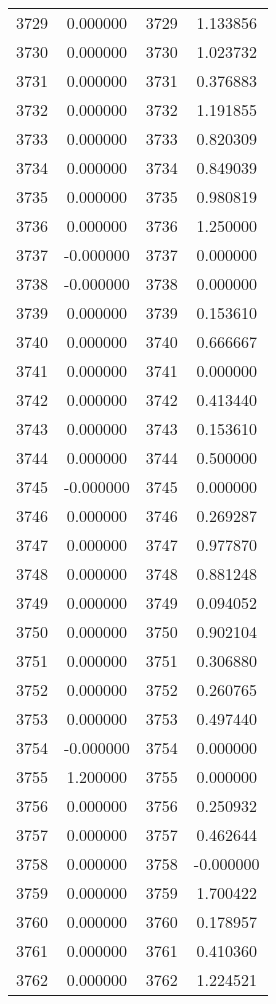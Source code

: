 \documentclass[12pt]{article}
\begin{document}
\begin{longtable}{@{}cccc@{}}
3729 & 0.000000 & 3729 & 1.133856 \\
3730 & 0.000000 & 3730 & 1.023732 \\
3731 & 0.000000 & 3731 & 0.376883 \\
3732 & 0.000000 & 3732 & 1.191855 \\
3733 & 0.000000 & 3733 & 0.820309 \\
3734 & 0.000000 & 3734 & 0.849039 \\
3735 & 0.000000 & 3735 & 0.980819 \\
3736 & 0.000000 & 3736 & 1.250000 \\
3737 & -0.000000 & 3737 & 0.000000 \\
3738 & -0.000000 & 3738 & 0.000000 \\
3739 & 0.000000 & 3739 & 0.153610 \\
3740 & 0.000000 & 3740 & 0.666667 \\
3741 & 0.000000 & 3741 & 0.000000 \\
3742 & 0.000000 & 3742 & 0.413440 \\
3743 & 0.000000 & 3743 & 0.153610 \\
3744 & 0.000000 & 3744 & 0.500000 \\
3745 & -0.000000 & 3745 & 0.000000 \\
3746 & 0.000000 & 3746 & 0.269287 \\
3747 & 0.000000 & 3747 & 0.977870 \\
3748 & 0.000000 & 3748 & 0.881248 \\
3749 & 0.000000 & 3749 & 0.094052 \\
3750 & 0.000000 & 3750 & 0.902104 \\
3751 & 0.000000 & 3751 & 0.306880 \\
3752 & 0.000000 & 3752 & 0.260765 \\
3753 & 0.000000 & 3753 & 0.497440 \\
3754 & -0.000000 & 3754 & 0.000000 \\
3755 & 1.200000 & 3755 & 0.000000 \\
3756 & 0.000000 & 3756 & 0.250932 \\
3757 & 0.000000 & 3757 & 0.462644 \\
3758 & 0.000000 & 3758 & -0.000000 \\
3759 & 0.000000 & 3759 & 1.700422 \\
3760 & 0.000000 & 3760 & 0.178957 \\
3761 & 0.000000 & 3761 & 0.410360 \\
3762 & 0.000000 & 3762 & 1.224521 \\

\end{longtable}
\end{document}
